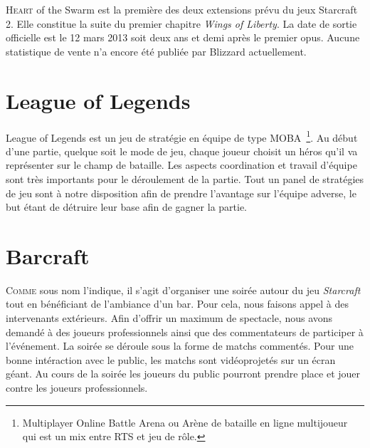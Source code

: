 \lettrine{H}{eart} of the Swarm est la première des deux extensions
prévu du jeux Starcraft 2. Elle constitue la suite du premier chapitre
\emph{Wings of Liberty}. La date de sortie officielle est le 12 mars 2013 soit
deux ans et demi après le premier opus. Aucune statistique de vente n'a
encore été publiée par Blizzard actuellement.


\section{League of Legends}%
\label{sec:league_of_legends}

League of Legends est un jeu de stratégie en équipe de type
MOBA\, \footnote{Multiplayer Online Battle Arena ou Arène de bataille en
ligne multijoueur qui est un mix entre RTS et jeu de rôle.}. Au début d'une partie, quelque
soit le mode de jeu, chaque joueur choisit un héros qu'il va représenter
sur le champ de bataille. Les aspects coordination et travail d'équipe
sont très importants pour le déroulement de la partie. Tout un panel de
stratégies de jeu sont à notre disposition afin de prendre l'avantage sur
l'équipe adverse, le but étant de détruire leur base afin de
gagner la partie.

\section{Barcraft}%
\label{sec:barcraft}

\lettrine{C}{omme} sous nom l'indique, il s'agit d'organiser une soirée
autour du jeu \emph{Starcraft} tout en bénéficiant de l'ambiance d'un bar. Pour cela, nous
faisons appel à des intervenants extérieurs. Afin d'offrir un maximum
de spectacle, nous avons demandé à des joueurs professionnels ainsi que
des commentateurs de participer à l'événement. La soirée
se déroule sous la forme de matchs commentés. Pour une bonne intéraction
avec le public, les matchs sont vidéoprojetés sur un écran géant. Au
cours de la soirée les joueurs du public pourront prendre place et jouer
contre les joueurs professionnels.

